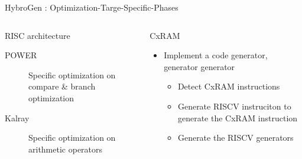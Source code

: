 \begin{Frame}{HybroGen : Optimization-Targe-Specific-Phases}
 \begin{columns}[t]
  \begin{column}{\BW}
    \begin{block}{RISC architecture}
      \begin{description}
      \item[POWER] Specific optimization on compare \& branch optimization
      \item[Kalray] Specific optimization on arithmetic operators
      \end{description}
    \end{block}
  \end{column}
  \begin{column}{\BW}
    \begin{block}{CxRAM}
      \begin{itemize}
      \item Implement a code generator, generator generator
        \begin{itemize}
        \item Detect CxRAM instructions
        \item Generate RISCV instruciton to generate the CxRAM
          instruction
        \item Generate the RISCV generators
        \end{itemize}
      \end{itemize}
    \end{block}
  \end{column}

 \end{columns}
\end{Frame}
